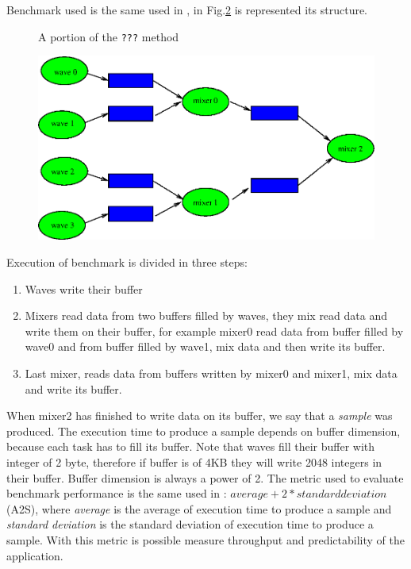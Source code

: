 Benchmark used is the same used in \cite{lcs}, in Fig.\ref{fig:bench} is
represented its structure.\begin{figure}[h]

  \label{code:ttwu}
  \caption{A portion of the \texttt{???} method}
\end{figure}


\begin{figure}[htbp]
\centering
\includegraphics[width=\widefigure]{images/bench.eps}
\caption{}
\label{fig:bench}
\end{figure}

Execution of benchmark is divided in three steps:

\begin{enumerate}
\item Waves write their buffer
\item Mixers read data from two buffers filled by waves, they mix read data and write them on their buffer, for example mixer0 read data from buffer filled 
by wave0 and from buffer filled by wave1, mix data and then write its buffer.
\item Last mixer, reads data from buffers written by mixer0 and mixer1, mix data and write its buffer.
\end{enumerate}

When mixer2 has finished to write data on its buffer, we say that a \textit{sample} was produced. The execution time to produce a sample depends on buffer 
dimension, because each task has to fill its buffer. Note that waves fill their buffer with integer of 2 byte, therefore if buffer is of 4KB they will
write 2048 integers in their buffer. Buffer dimension is always a power of 2.
The metric used to evaluate benchmark performance is the same used in \cite{lcs}: $average + 2*standard deviation$ (A2S), where \textit{average} is the 
average of execution time to produce a sample and \textit{standard deviation} is the standard deviation of execution time to produce a sample. With this 
metric is possible measure throughput and predictability of the application.

